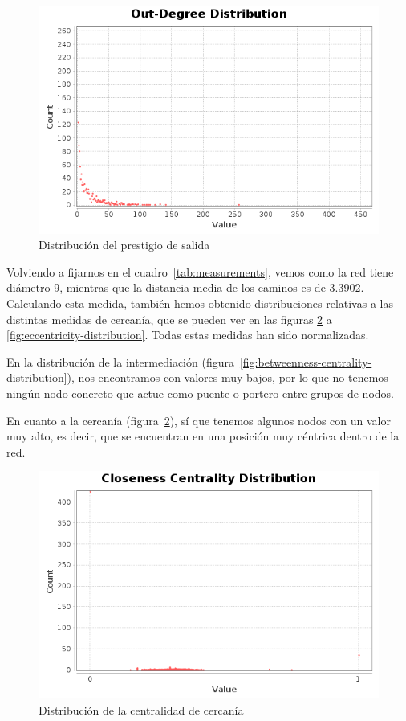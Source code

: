 \begin{figure}
    \includegraphics[width=\textwidth]{images/plots/outdegree-distribution.png}
    \caption{Distribución del prestigio de salida}
    \label{fig:outdegree-distribution}
\end{figure}

\newpage

Volviendo a fijarnos en el cuadro~\ref{tab:measurements}, vemos como la red
tiene diámetro 9, mientras que la distancia media de los caminos es de 3.3902.
Calculando esta medida, también hemos obtenido distribuciones relativas a las
distintas medidas de cercanía, que se pueden ver en las figuras
\ref{fig:closeness-centrality-distribution} a
\ref{fig:eccentricity-distribution}. Todas estas medidas han sido normalizadas.

En la distribución de la intermediación
(figura~\ref{fig:betweenness-centrality-distribution}), nos encontramos con
valores muy bajos, por lo que no tenemos ningún nodo concreto que actue como
puente o portero entre grupos de nodos.

En cuanto a la cercanía (figura~\ref{fig:closeness-centrality-distribution}), sí
que tenemos algunos nodos con un valor muy alto, es decir, que se encuentran en
una posición muy céntrica dentro de la red.

\begin{figure}
    \includegraphics[width=\textwidth]{images/plots/closeness-centrality-distribution.png}
    \caption{Distribución de la centralidad de cercanía}
    \label{fig:closeness-centrality-distribution}
\end{figure}

